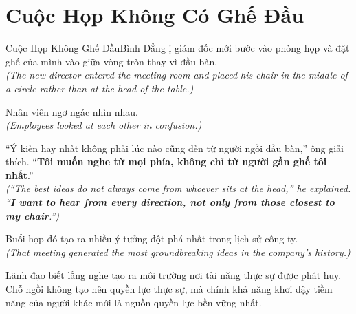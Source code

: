\section{Cuộc Họp Không Có Ghế Đầu}
\begin{truyen}{Cuộc Họp Không Ghế Đầu}{Bình Đẳng}
ị giám đốc mới bước vào phòng họp và đặt ghế của mình vào giữa vòng tròn thay vì đầu bàn.\\
\textit{(The new director entered the meeting room and placed his chair in the middle of a circle rather than at the head of the table.)}

Nhân viên ngơ ngác nhìn nhau.\\
\textit{(Employees looked at each other in confusion.)}

``Ý kiến hay nhất không phải lúc nào cũng đến từ người ngồi đầu bàn,'' ông giải thích. ``\textbf{Tôi muốn nghe từ mọi phía, không chỉ từ người gần ghế tôi nhất}.''\\
\textit{(``The best ideas do not always come from whoever sits at the head,'' he explained. ``\textbf{I want to hear from every direction, not only from those closest to my chair}.'')}

Buổi họp đó tạo ra nhiều ý tưởng đột phá nhất trong lịch sử công ty.\\
\textit{(That meeting generated the most groundbreaking ideas in the company's history.)}
\end{truyen}
\begin{baihoc}
  Lãnh đạo biết lắng nghe tạo ra môi trường nơi tài năng thực sự được phát huy. Chỗ ngồi không tạo nên quyền lực thực sự, mà chính khả năng khơi dậy tiềm năng của người khác mới là nguồn quyền lực bền vững nhất.
\end{baihoc}

